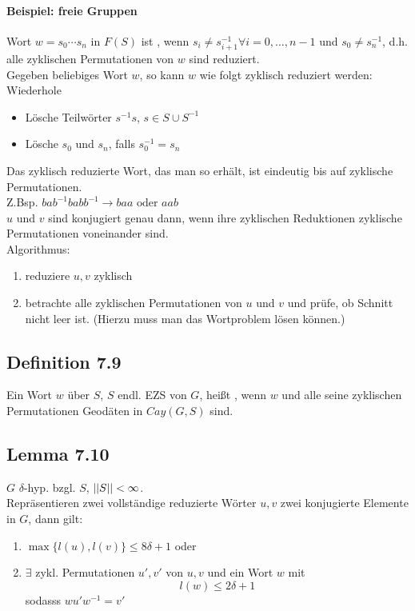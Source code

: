 \documentclass{article}
\begin{document}
\paragraph{Beispiel: freie Gruppen}
Wort $w = s_0\cdots s_n$ in $F(S)$ ist , wenn $s_i \neq s_{i+1}^{-1} \forall i = 0,\ldots, n-1$ und $s_0 \neq s_n^{-1}$, d.h. alle zyklischen Permutationen von $w$ sind reduziert.\\
Gegeben beliebiges Wort $w$, so kann $w$ wie folgt zyklisch reduziert werden:\\
Wiederhole
\begin{itemize}
	\item Lösche Teilwörter $s^{-1}s$, $s \in S\cup S^{-1}$
	\item Lösche $s_0$ und $s_n$, falls $s_0^{-1} = s_n$
\end{itemize}
Das zyklisch reduzierte Wort, das man so erhält, ist eindeutig bis auf zyklische Permutationen.\\
Z.Bsp. $bab^{-1}babb^{-1} \longrightarrow baa \text{ oder } aab$\\
$u$ und $v$ sind konjugiert genau dann, wenn ihre zyklischen Reduktionen zyklische Permutationen voneinander sind.\\
Algorithmus:
\begin{enumerate}
	\item reduziere $u,v$ zyklisch
	\item betrachte alle zyklischen Permutationen von $u$ und $v$ und prüfe, ob Schnitt nicht leer ist. (Hierzu muss man das Wortproblem lösen können.)
\end{enumerate}

\subsection{Definition 7.9}
Ein Wort $w$ über $S$, $S$ endl. EZS von $G$, heißt , wenn $w$ und alle seine zyklischen Permutationen Geodäten in $Cay(G,S)$ sind.

\subsection{Lemma 7.10}
$G$ $\delta$-hyp. bzgl. $S$, $\left|\left|S\right|\right| < \infty$.\\
Repräsentieren zwei vollständige reduzierte Wörter $u,v$ zwei konjugierte Elemente in $G$, dann gilt:
\begin{enumerate}
	\item $\max\{l(u), l(v)\} \leq 8\delta + 1$ oder
	\item $\exists$ zykl. Permutationen $u',v'$ von $u,v$ und ein Wort $w$ mit
	\[l(w)  \leq 2\delta +1  \]
	sodasss $wu'w^{-1} = v'$
\end{enumerate}
\end{document}
